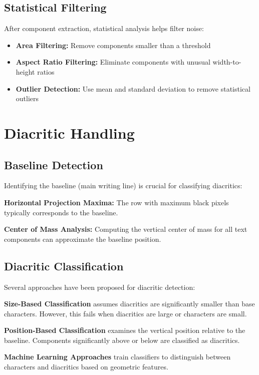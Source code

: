 \documentclass[12pt,a4paper,oneside]{report}
\begin{document}
\subsection{Statistical Filtering}

After component extraction, statistical analysis helps filter noise:
\begin{itemize}
    \item \textbf{Area Filtering:} Remove components smaller than a threshold
    \item \textbf{Aspect Ratio Filtering:} Eliminate components with unusual width-to-height ratios
    \item \textbf{Outlier Detection:} Use mean and standard deviation to remove statistical outliers
\end{itemize}

\section{Diacritic Handling}

\subsection{Baseline Detection}

Identifying the baseline (main writing line) is crucial for classifying diacritics:

\textbf{Horizontal Projection Maxima:} The row with maximum black pixels typically corresponds to the baseline.

\textbf{Center of Mass Analysis:} Computing the vertical center of mass for all text components can approximate the baseline position.

\subsection{Diacritic Classification}

Several approaches have been proposed for diacritic detection:

\textbf{Size-Based Classification} \cite{lorigo2006off} assumes diacritics are significantly smaller than base characters. However, this fails when diacritics are large or characters are small.

\textbf{Position-Based Classification} examines the vertical position relative to the baseline. Components significantly above or below are classified as diacritics.

\textbf{Machine Learning Approaches} \cite{abandon2015arabic} train classifiers to distinguish between characters and diacritics based on geometric features.
\end{document}
